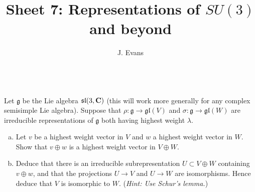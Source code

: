\documentclass[12pt]{article}
\title{Sheet 7: Representations of $SU(3)$ and beyond}
\author{J. Evans}
\date{}
\begin{document}
\maketitle

\begin{question}\ \\
Let $\mathfrak{g}$ be the Lie algebra $\mathfrak{sl}(3,\mathbf{C})$ (this will work more generally for any complex semisimple Lie algebra). Suppose that $\rho\colon \mathfrak{g}\to \mathfrak{gl}(V)$ and $\sigma\colon \mathfrak{g}\to \mathfrak{gl}(W)$ are irreducible representations of $\mathfrak{g}$ both having highest weight $\lambda$.
\begin{enumerate}[(a)]
\item Let $v$ be a highest weight vector in $V$ and $w$ a highest weight vector in $W$. Show that $v\oplus w$ is a highest weight vector in $V\oplus W$.
\item Deduce that there is an irreducible subrepresentation $U\subset V\oplus W$ containing $v\oplus w$, and that the projections $U\to V$ and $U\to W$ are isomorphisms. Hence deduce that $V$ is isomorphic to $W$. ({\em Hint: Use Schur's lemma.})
\end{enumerate}
\end{question}

\iffalse
\begin{answer}
Let $\mathfrak{h}$ be a Cartan subalgebra.
\begin{enumerate}[(a)]
\item For $H$ in $\mathfrak{h}$ and $x\in V_{\lambda_1}$, $y\in W_{\lambda_2}$ we have
\[\rho(H)x=\lambda_1(H)x\mbox{ and }\sigma(H)y=\lambda_2(H)y\]
so
\[(\rho\oplus\sigma)(H)(x\oplus 0)=\rho(H)x\oplus 0=\lambda_1(H)x\oplus 0\]
and
\[(\rho\oplus\sigma)(H)(0\oplus y)=0\oplus \sigma(H)y=0\oplus \lambda_2(H)y\]
so the weights in the representation $V\oplus W$ are precisely the union of weights in $V$ and in $W$. Therefore $\lambda$ is the highest weight and $v\oplus w$ is one of the highest weight vectors.
\item The images of $v\oplus w$ under words in the matrices $(\rho\oplus\sigma)(E)$ (where $E$ is a negative root) generate an irreducible subrepresentation of highest weight $\lambda$ which we call $U$. The projections of $U$ to $V$ and to $W$ are nontrivial (in particular, their images contain $v$ and $w$) but these projections are morphisms of irreducible representations and are therefore isomorphisms by Schur's lemma.
\end{enumerate}
\end{answer}
\newpage
\fi
\end{document}
